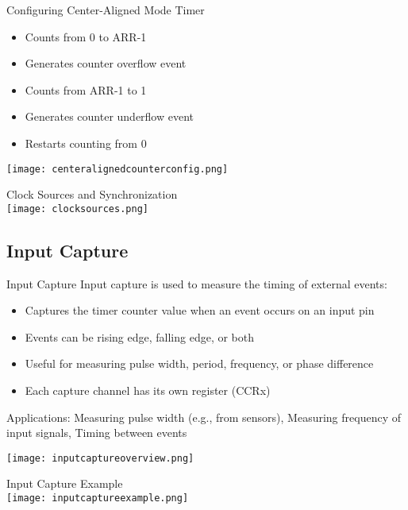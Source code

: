 \begin{example2}{Configuring Center-Aligned Mode Timer}
    \begin{itemize}
        \item Counts from 0 to ARR-1
        \item Generates counter overflow event
        \item Counts from ARR-1 to 1
        \item Generates counter underflow event
        \item Restarts counting from 0
    \end{itemize}

    \texttt{[image: centeralignedcounterconfig.png]}
\end{example2}

\begin{concept}{Clock Sources and Synchronization}\\
    \texttt{[image: clocksources.png]}
\end{concept}

\raggedcolumns
\pagebreak

\subsection{Input Capture}

\begin{definition}{Input Capture}
Input capture is used to measure the timing of external events:
\begin{itemize}
    \item Captures the timer counter value when an event occurs on an input pin
    \item Events can be rising edge, falling edge, or both
    \item Useful for measuring pulse width, period, frequency, or phase difference
    \item Each capture channel has its own register (CCRx)
\end{itemize}
Applications: Measuring pulse width (e.g., from sensors), Measuring frequency of input signals, Timing between events

\texttt{[image: inputcaptureoverview.png]}
\end{definition}

\begin{example2}{Input Capture Example}\\
    \texttt{[image: inputcaptureexample.png]}
\end{example2}

